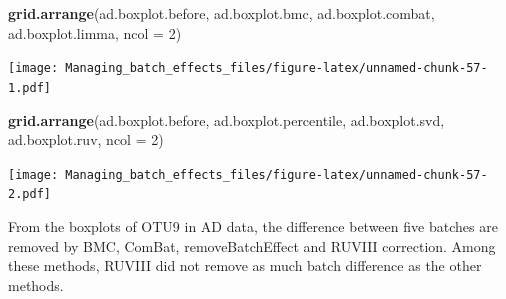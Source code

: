 \documentclass[]{book}
\newenvironment{Shaded}{\begin{snugshade}}{\end{snugshade}}
\newcommand{\KeywordTok}[1]{\textcolor[rgb]{0.13,0.29,0.53}{\textbf{#1}}}
\newcommand{\DataTypeTok}[1]{\textcolor[rgb]{0.13,0.29,0.53}{#1}}
\newcommand{\DecValTok}[1]{\textcolor[rgb]{0.00,0.00,0.81}{#1}}
\newcommand{\StringTok}[1]{\textcolor[rgb]{0.31,0.60,0.02}{#1}}
\newcommand{\OperatorTok}[1]{\textcolor[rgb]{0.81,0.36,0.00}{\textbf{#1}}}
\newcommand{\NormalTok}[1]{#1}
\begin{document}
\begin{Shaded}
\end{Shaded}

\begin{Shaded}
\begin{Highlighting}[]
\KeywordTok{grid.arrange}\NormalTok{(ad.boxplot.before, ad.boxplot.bmc, }
\NormalTok{             ad.boxplot.combat, ad.boxplot.limma, }\DataTypeTok{ncol =} \DecValTok{2}\NormalTok{)}
\end{Highlighting}
\end{Shaded}

\texttt{[image: Managing\_batch\_effects\_files/figure-latex/unnamed-chunk-57-1.pdf]}

\begin{Shaded}
\begin{Highlighting}[]
\KeywordTok{grid.arrange}\NormalTok{(ad.boxplot.before, ad.boxplot.percentile, }
\NormalTok{             ad.boxplot.svd, ad.boxplot.ruv, }\DataTypeTok{ncol =} \DecValTok{2}\NormalTok{)}
\end{Highlighting}
\end{Shaded}

\texttt{[image: Managing\_batch\_effects\_files/figure-latex/unnamed-chunk-57-2.pdf]}

From the boxplots of OTU9 in AD data, the difference between five
batches are removed by BMC, ComBat, removeBatchEffect and RUVIII
correction. Among these methods, RUVIII did not remove as much batch
difference as the other methods.
\end{document}
